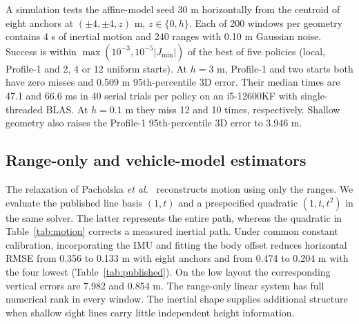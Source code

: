 \documentclass{IEEEtaes}
\begin{document}
A simulation tests the affine-model seed 30 m horizontally from the centroid of eight anchors at \((\pm4,\pm4,z)\) m, \(z\in\{0,h\}\). Each of 200 windows per geometry contains 4 s of inertial motion and 240 ranges with 0.10 m Gaussian noise. Success is within \(\max(10^{-3},10^{-5}|J_{\min}|)\) of the best of five policies (local, Profile-1 and 2, 4 or 12 uniform starts). At \(h=3\) m, Profile-1 and two starts both have zero misses and 0.509 m 95th-percentile 3D error. Their median times are 47.1 and 66.6 ms in 40 serial trials per policy on an i5-12600KF with single-threaded BLAS. At \(h=0.1\) m they miss 12 and 10 times, respectively. Shallow geometry also raises the Profile-1 95th-percentile 3D error to 3.946 m.

\subsection{Range-only and vehicle-model estimators}
The relaxation of Pacholska \emph{et al.}~\cite{pacholska} reconstructs motion using only the ranges. We evaluate the published line basis \((1,t)\) and a prespecified quadratic \((1,t,t^2)\) in the same solver. The latter represents the entire path, whereas the quadratic in Table~\ref{tab:motion} corrects a measured inertial path. Under common constant calibration, incorporating the IMU and fitting the body offset reduces horizontal RMSE from 0.356 to 0.133 m with eight anchors and from 0.474 to 0.204 m with the four lowest (Table~\ref{tab:published}). On the low layout the corresponding vertical errors are 7.982 and 0.854 m. The range-only linear system has full numerical rank in every window. The inertial shape supplies additional structure when shallow sight lines carry little independent height information.
\end{document}
